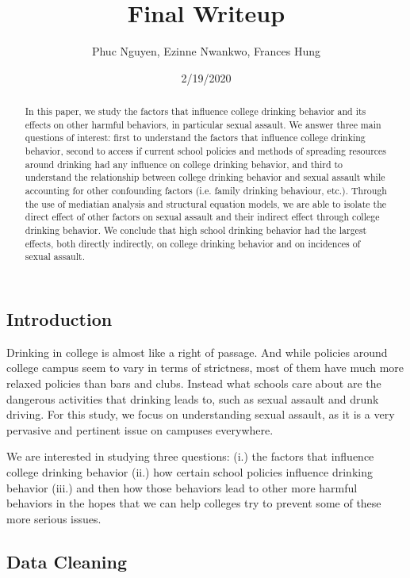 \documentclass[]{article}
\title{Final Writeup}
\author{Phuc Nguyen, Ezinne Nwankwo, Frances Hung}
\date{2/19/2020}
\begin{document}
\maketitle

\begin{abstract}
In this paper, we study the factors that influence college drinking behavior and its effects on other harmful behaviors, in particular sexual assault. We answer three main questions of interest: first to understand the factors that influence college drinking behavior, second to access if current school policies and methods of spreading resources around drinking had any influence on college drinking behavior, and third to understand the relationship between college drinking behavior and sexual assault while accounting for other confounding factors (i.e. family drinking behaviour, etc.). Through the use of mediatian analysis and structural equation models, we are able to isolate the direct effect of other factors on sexual assault and their indirect effect through college drinking behavior. We conclude that high school drinking behavior had the largest effects, both directly indirectly, on college drinking behavior and on incidences of sexual assault. 
\end{abstract}

\hypertarget{introduction}{%
\subsection{Introduction}\label{introduction}}

Drinking in college is almost like a right of passage. And while
policies around college campus seem to vary in terms of strictness, most
of them have much more relaxed policies than bars and clubs. Instead
what schools care about are the dangerous activities that drinking leads
to, such as sexual assault and drunk driving. For this study, we focus
on understanding sexual assault, as it is a very pervasive and pertinent
issue on campuses everywhere.

We are interested in studying three questions: (i.) the factors that
influence college drinking behavior (ii.) how certain school policies
influence drinking behavior (iii.) and then how those behaviors lead to
other more harmful behaviors in the hopes that we can help colleges try
to prevent some of these more serious issues.

\hypertarget{data-cleaning}{%
\subsection{Data Cleaning}\label{data-cleaning}}
\end{document}
